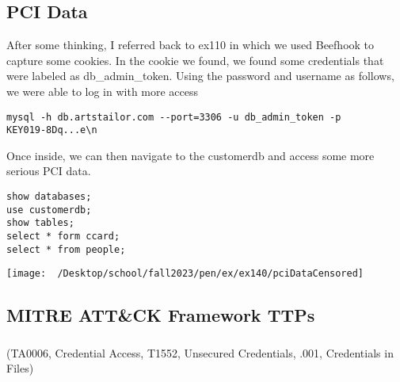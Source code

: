 \documentclass[notitlepage]{article}
\begin{document}
    \subsection{PCI Data}
    After some thinking, I referred back to ex110 in which we used Beefhook to capture some cookies. In the cookie we found, we found
    some credentials that were labeled as db{\_}admin{\_}token. Using the password and username as follows, we were able
    to log in with more access
\begin{verbatim}
mysql -h db.artstailor.com --port=3306 -u db_admin_token -p
KEY019-8Dq...e\n
\end{verbatim}
    Once inside, we can then navigate to the customerdb and access some more serious PCI data.
\begin{verbatim}
show databases;
use customerdb;
show tables;
select * form ccard;
select * from people;
\end{verbatim}

\texttt{[image: ~/Desktop/school/fall2023/pen/ex/ex140/pciDataCensored]} \\

    
    \subsection{MITRE ATT{\&}CK Framework TTPs}
	
	\subsubsection*{}
	\ttp(TA0006, Credential Access, T1552, Unsecured Credentials, .001, Credentials in Files)
    
	
\end{document}
